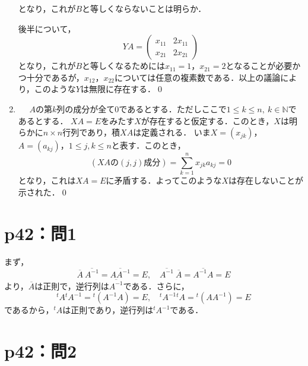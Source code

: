 \begin{tanswer}
\begin{enumerate}
\[          \]
          となり，これが$B$と等しくならないことは明らか．\par
          後半について，
          \[
            YA =\begin{pmatrix} x_{11} & 2 x_{11} \\  x_{21}&  2x_{21} \end{pmatrix}
          \]
          となり，これが$B$と等しくなるためには$x_{11}=1$，$x_{21}=2$となることが必要かつ十分であるが，$x_{12}$，$x_{22}$については任意の複素数である．以上の議論により，このような$Y$は無限に存在する．\qed
    \item  \mbox{　}
          $A$の第$k$列の成分が全て$0$であるとする．ただしここで$ 1 \le k \le n,~ k \in \mathbb{N}$であるとする．
          $XA=E$をみたす$X$が存在すると仮定する．このとき，$X$は明らかに$n \times n$行列であり，積$XA$は定義される．
          いま$X=(x_{jk})$，$A=(a_{kj})$，$ 1 \le j ,k \le n$と表す．このとき，
          \[
            (XA \text{の}(j,j)\text{成分}) = \sum_{k=1}^{n} x_{jk} a_{kj} =0
          \]
          となり，これは$XA =E$に矛盾する．よってこのような$X$は存在しないことが示された．\qed
  \end{enumerate}
\end{tanswer}


\section*{p42：問1}

\begin{tproof}
  まず，
  \[
    \overline{A} \ \overline{A^{-1}} = \overline{A A^{-1}}=E,\quad \overline{A^{-1}} \ \overline{A} =\overline{A^{-1} A}=E
  \]
  より，$\overline{A}$は正則で，逆行列は$\overline{A^{-1}}$である．さらに，
  \[
    {}^t A {}^t A^{-1} ={}^t (A^{-1} A)=E,\quad {}^t A^{-1} {}^t A = {}^t (A A^{-1})=E
  \]
  であるから，${}^t A$は正則であり，逆行列は${}^t A^{-1}$である．
\end{tproof}

\section*{p42：問2}

